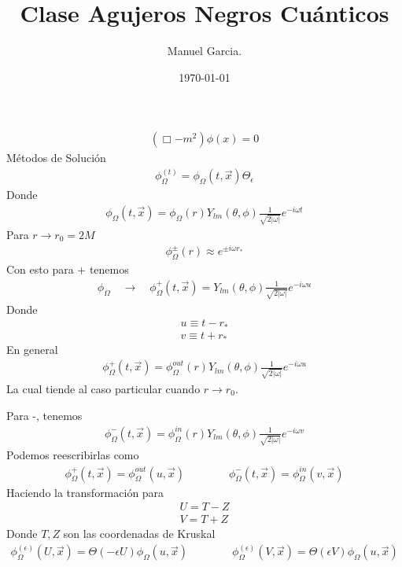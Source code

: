 \documentclass{article}
\title{Clase Agujeros Negros Cuánticos }
\author{Manuel Garcia.}
\date{\today}
\begin{document}
\maketitle

\section{}
\begin{gather*}
  (\Box - m^2 ) \phi(x) = 0  
\end{gather*}
Métodos de Solución 
\begin{gather*}
  \phi^{(t)}_{\Omega} = \phi_\Omega(t,\vec x) \Theta_\epsilon 
\end{gather*}
Donde 
\begin{gather*}
  \phi_\Omega (t,\vec x ) = \phi_\Omega (r) Y _{lm } (\theta,\phi) \frac{1}{\sqrt{2 \left|\omega\right|} } e ^ {- i \omega t } 
\end{gather*}
Para $ r \rightarrow r_0 = 2M  $ 
\begin{gather*}
  \phi_\Omega ^ {\pm } (r) \approx  e ^ {\pm i \omega r_*} 
\end{gather*}
Con esto para $ +  $ tenemos 
\begin{gather*}
  \phi_\Omega \quad \rightarrow \quad \phi_\Omega ^ {+ } (t , \vec x) = Y _{lm }  (\theta, \phi) \frac{1}{\sqrt{2 \left|\omega\right|} } e ^ {- i \omega u }
\end{gather*}
Donde 
\begin{gather*}
  u \equiv t- r_* \\
  v \equiv t + r_* 
\end{gather*}
En general 
\begin{gather*}
  \phi_\Omega ^+ (t, \vec x) = \phi_\Omega ^ {out }(r) Y _{lm } (\theta ,\phi) \frac{1}{\sqrt{2 \left|\omega\right|} } e ^ {- i \omega u } 
\end{gather*}
La cual tiende al caso particular cuando $ r \rightarrow r_0  $.

Para -, tenemos 
\begin{gather*}
  \phi_\Omega^- (t, \vec x) = \phi_\Omega ^ {in }(r) Y _{lm } (\theta, \phi) \frac{1}{\sqrt{2 \left|\omega\right|} } e ^ {- i \omega v } 
\end{gather*}
Podemos reescribirlas como 
\begin{gather*}
  \phi_\Omega ^ {+ } (t,\vec x) = \phi_\Omega ^ {out } (u, \vec x) \qquad \qquad \phi_\Omega ^ {- } (t,\vec x) = \phi_\Omega ^ {in } (v, \vec x) 
\end{gather*}
Haciendo la transformación para 
\begin{gather*}
   U = T-Z \\
   V = T+Z
\end{gather*}
Donde $ T,Z  $ son las coordenadas de Kruskal 
\begin{gather*}
  \phi_\Omega ^ {(\epsilon) } (U, \vec x ) = \Theta (- \epsilon U ) \phi_\Omega (u,\vec x)  \qquad \qquad 
  \phi_\Omega ^ {(\epsilon) } (V, \vec x ) = \Theta (\epsilon V ) \phi_\Omega (u,\vec x)  
\end{gather*}
\end{document}

